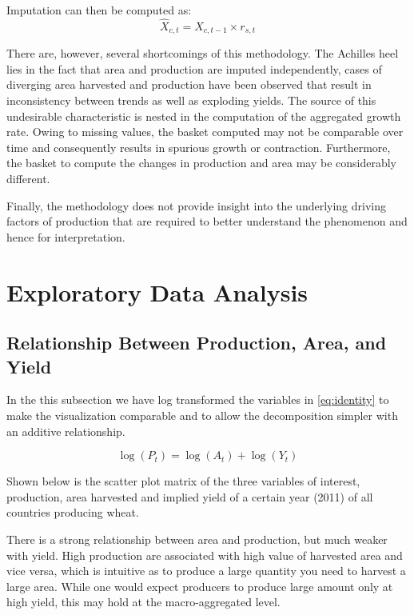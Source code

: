\documentclass[nojss]{jss}\usepackage[]{graphicx}\usepackage[]{color}
\begin{document}
Imputation can then be computed as:
\begin{equation}
  \hat{X}_{c, t} = X_{c, t-1} \times r_{s, t}
\end{equation}
  

There are, however, several shortcomings of this methodology. The
Achilles heel lies in the fact that area and production are imputed
independently, cases of diverging area harvested and production have
been observed that result in inconsistency between trends as well as
exploding yields. The source of this undesirable characteristic is
nested in the computation of the aggregated growth rate. Owing to
missing values, the basket computed may not be comparable over time
and consequently results in spurious growth or
contraction. Furthermore, the basket to compute the changes in
production and area may be considerably different.

Finally, the methodology does not provide insight into the underlying
driving factors of production that are required to better understand
the phenomenon and hence for interpretation.


\section{Exploratory Data Analysis}




\subsection{Relationship Between Production, Area, and Yield}

In the this subsection we have log transformed the variables in
\ref{eq:identity} to make the visualization comparable and to allow
the decomposition simpler with an additive relationship.

\begin{equation}
  \label{eq:logIdentity}
  \log(P_t) = \log(A_t) + \log(Y_t)
\end{equation}

Shown below is the scatter plot matrix of the three variables of
interest, production, area harvested and implied yield of a certain
year (2011) of all countries producing wheat. 

There is a strong relationship between area and production, but much
weaker with yield. High production are associated with high value of
harvested area and vice versa, which is intuitive as to produce a
large quantity you need to harvest a large area. While one would
expect producers to produce large amount only at high yield, this may
hold at the macro-aggregated level.
\end{document}
